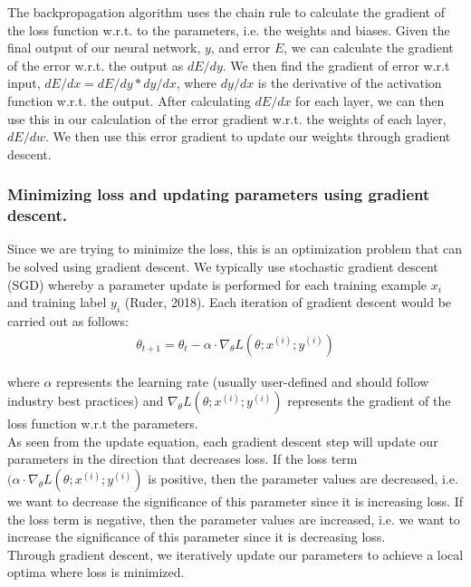 \documentclass[11pt]{article}
\begin{document}
The backpropagation algorithm uses the chain rule to calculate the
gradient of the loss function w.r.t. to the parameters, i.e. the weights
and biases. Given the final output of our neural network, \(y\), and
error \(E\), we can calculate the gradient of the error w.r.t. the
output as \(dE/dy\). We then find the gradient of error w.r.t input,
\(dE/dx = dE/dy * dy/dx\), where \(dy/dx\) is the derivative of the
activation function w.r.t. the output. After calculating \(dE/dx\) for
each layer, we can then use this in our calculation of the error
gradient w.r.t. the weights of each layer, \(dE/dw\). We then use this
error gradient to update our weights through gradient descent.

\subsubsection{Minimizing loss and updating parameters using
gradient
descent.}\label{minimizing-loss-and-updating-parameters-using-gradient-descent.}

Since we are trying to minimize the loss, this is an optimization
problem that can be solved using gradient descent. We typically use
stochastic gradient descent (SGD) whereby a parameter update is
performed for each training example \(x_i\) and training label \(y_i\)
(Ruder, 2018). Each iteration of gradient descent would be carried out
as follows:
\begin{align*}
\theta_{t+1} = \theta_t - \alpha \cdot \nabla_\theta L( \theta; x^{(i)}; y^{(i)})
\end{align*}

where \(\alpha\) represents the learning rate (usually user-defined and
should follow industry best practices) and
\(\nabla_\theta L( \theta; x^{(i)}; y^{(i)})\) represents the gradient
of the loss function w.r.t the parameters.\\

As seen from the update equation, each gradient descent step will update
our parameters in the direction that decreases loss. If the loss term
\((\alpha \cdot \nabla_\theta L( \theta; x^{(i)}; y^{(i)})\) is
positive, then the parameter values are decreased, i.e. we want to
decrease the significance of this parameter since it is increasing loss.
If the loss term is negative, then the parameter values are increased,
i.e. we want to increase the significance of this parameter since it is
decreasing loss.\\

Through gradient descent, we iteratively update our parameters to
achieve a local optima where loss is minimized.
\end{document}
